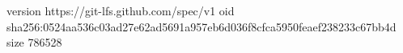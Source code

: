 version https://git-lfs.github.com/spec/v1
oid sha256:0524aa536c03ad27e62ad5691a957eb6d036f8cfca5950feaef238233c67bb4d
size 786528
